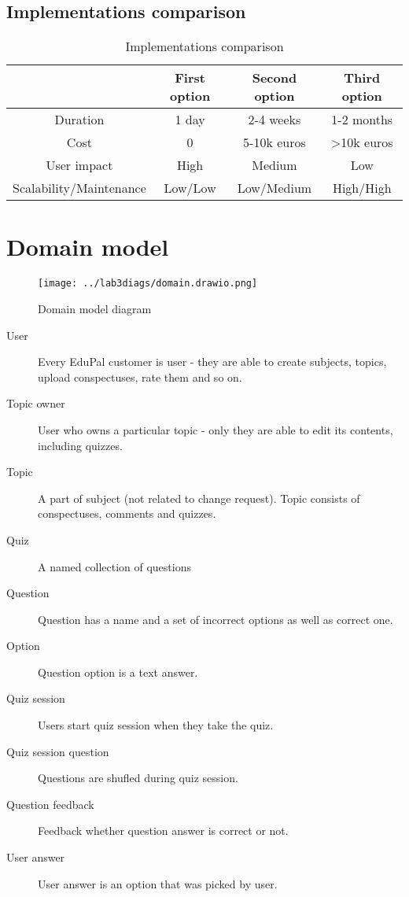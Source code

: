 \documentclass[
    english, %
]{VUMIFPSkursinis}
\begin{document}
\subsection{Implementations comparison}

\begin{table}[H]
    \centering
    \begin{tabular}{|c|c|c|c|}
        \hline
        & First option & Second option & Third option \\
        \hline
        Duration & 1 day & 2-4 weeks & 1-2 months \\
        \hline
        Cost & 0 & 5-10k euros & >10k euros \\
        \hline
        User impact & High & Medium & Low \\
        \hline
        Scalability/Maintenance & Low/Low & Low/Medium & High/High \\
        \hline
    \end{tabular}
    \caption{Implementations comparison}
    \label{tab:implementations-comparison}
\end{table}

\section{Domain model}

\begin{figure}[ht]
    \centering
    \texttt{[image: ../lab3diags/domain.drawio.png]}
    \caption{Domain model diagram}
    \label{domain-model}
\end{figure}

\begin{description}
    \item[User] Every EduPal customer is user - they are able to create subjects, topics, upload conspectuses, rate them and so on.
    \item[Topic owner] User who owns a particular topic - only they are able to edit its contents, including quizzes.
    \item[Topic] A part of subject (not related to change request). Topic consists of conspectuses, comments and quizzes.
    \item[Quiz] A named collection of questions
    \item[Question] Question has a name and a set of incorrect options as well as correct one.
    \item[Option] Question option is a text answer.
    \item[Quiz session] Users start quiz session when they take the quiz.
    \item[Quiz session question] Questions are shufled during quiz session.
    \item[Question feedback] Feedback whether question answer is correct or not.
    \item[User answer] User answer is an option that was picked by user.
\end{description}
\end{document}
